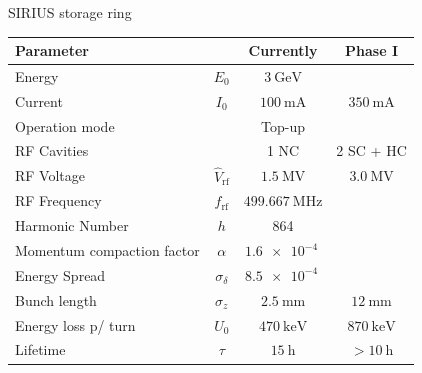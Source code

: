 \documentclass[aspectratio=169]{beamer}
\begin{document}
\begin{frame}{SIRIUS storage ring}
\begin{minipage}{0.62\textwidth}
        \begin{tabular}{lccc}
                \toprule\toprule
                Parameter & & Currently & Phase I \\
                \toprule
                Energy  & $E_0$  & $\SI{3}{\giga\electronvolt}$ & \\
                Current & $I_0$ &  $\SI{100}{\milli\ampere}$ & $\SI{350}{\milli\ampere}$ \\
                Operation mode & & Top-up &      \\
                RF Cavities & & 1 NC & 2 SC + HC \\
                RF Voltage & $\hat{V}_{\mathrm{rf}}$ &  $\SI{1.5}{\mega\volt}$ & $\SI{3.0}{\mega\volt}$\\
                RF Frequency &   $f_{\mathrm{rf}}$ &  $\SI{499.667}{\mega\hertz}$ &  \\
                Harmonic Number &   $h$ &  864 \\
                Momentum compaction factor & $\alpha$ &   $\SI{1.6e-4}{}$ & \\
                Energy Spread & $\sigma_\delta$ &  $\SI{8.5e-4}{}$ & \\
                Bunch length & $\sigma_z$ &  $\SI{2.5}{\milli\meter}$ & $\SI{12}{\milli\meter}$ \\
                Energy loss p/ turn & $U_0$ &  $\SI{470}{\kilo\electronvolt}$ & $\SI{870}{\kilo\electronvolt}$ \\
                Lifetime & $\tau$ & $\SI{15}{\hour}$ & $>\SI{10}{\hour}$ \\
                \bottomrule\bottomrule
        \end{tabular}
    \end{minipage}
\end{frame}
\end{document}
